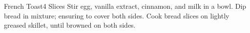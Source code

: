 \documentclass[../cookbook.tex]{subfiles}
\begin{document}
\begin{recipe}{French Toast}{4 Slices}{}
    Stir egg, vanilla extract, cinnamon, and milk in a bowl.
    Dip bread in mixture; ensuring to cover both sides.
    Cook bread slices on lightly greased skillet, until browned on both sides.

\end{recipe}
\end{document}

